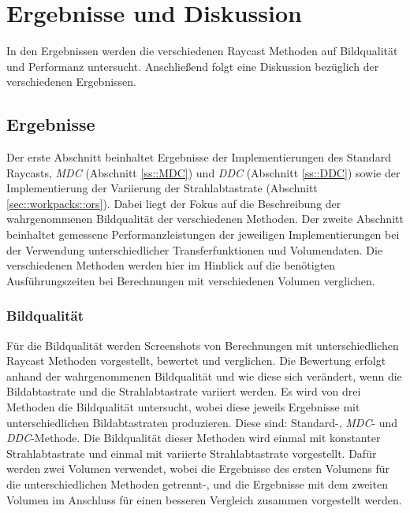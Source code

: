 \chapter{Ergebnisse und Diskussion}\label{chap::resdisc}
In den Ergebnissen werden die verschiedenen Raycast Methoden auf Bildqualität und Performanz untersucht.
Anschließend folgt eine Diskussion bezüglich der verschiedenen Ergebnissen.

\section{Ergebnisse}\label{sec::results}
Der erste Abschnitt beinhaltet Ergebnisse der Implementierungen des Standard Raycasts, \emph{MDC} (Abschnitt \ref{ss::MDC}) und \emph{DDC} (Abschnitt \ref{ss::DDC}) sowie der Implementierung der Variierung der Strahlabtastrate (Abschnitt \ref{sec::workpacks::ors}).
Dabei liegt der Fokus auf die Beschreibung der wahrgenommenen Bildqualität der verschiedenen Methoden.
Der zweite Abschnitt beinhaltet gemessene Performanzleistungen der jeweiligen Implementierungen bei der Verwendung unterschiedlicher Transferfunktionen und Volumendaten.
Die verschiedenen Methoden werden hier im Hinblick auf die benötigten Ausführungszeiten bei Berechnungen mit verschiedenen Volumen verglichen.

\subsection{Bildqualität}
Für die Bildqualität werden Screenshots von Berechnungen mit unterschiedlichen Raycast Methoden vorgestellt, bewertet und verglichen.
Die Bewertung erfolgt anhand der wahrgenommenen Bildqualität und wie diese sich verändert, wenn die Bildabtastrate und die Strahlabtastrate variiert werden.
Es wird von drei Methoden die Bildqualität untersucht, wobei diese jeweils Ergebnisse mit unterschiedlichen Bildabtastraten produzieren.
Diese sind: Standard-, \emph{MDC}- und \emph{DDC}-Methode.
Die Bildqualität dieser Methoden wird einmal mit konstanter Strahlabtastrate und einmal mit variierte Strahlabtastrate vorgestellt.
Dafür werden zwei Volumen verwendet, wobei die Ergebnisse des ersten Volumens für die unterschiedlichen Methoden getrennt-, und die Ergebnisse mit dem zweiten Volumen im Anschluss für einen besseren Vergleich zusammen vorgestellt werden.

